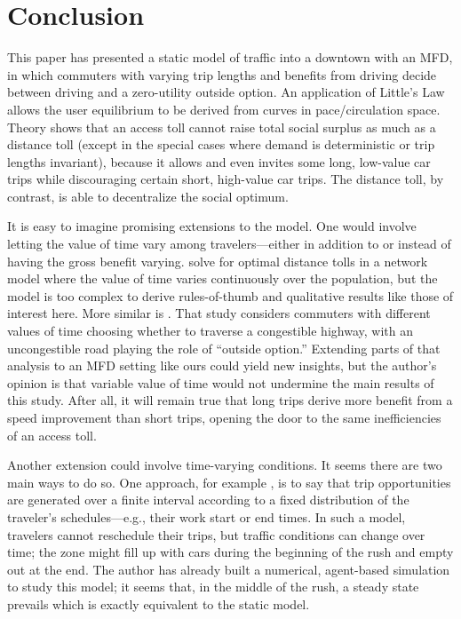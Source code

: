 \documentclass[preprint,authoryear]{elsarticle}
\begin{document}
\section{Conclusion}
\label{sec:conclusion}

This paper has presented a static model of traffic into a downtown with an MFD, in which commuters with varying trip lengths and benefits from driving decide between driving and a zero-utility outside option. An application of Little's Law allows the user equilibrium to be derived from curves in pace/circulation space. Theory shows that an access toll cannot raise total social surplus as much as a distance toll (except in the special cases where demand is deterministic or trip lengths invariant), because it allows and even invites some long, low-value car trips while discouraging certain short, high-value car trips. The distance toll, by contrast, is able to decentralize the social optimum.


It is easy to imagine promising extensions to the model. One would involve letting the value of time vary among travelers---either in addition to or instead of having the gross benefit varying.  \citet{Meng2012} solve for optimal distance tolls in a network model where the value of time varies continuously over the population, but the model is too complex to derive rules-of-thumb and qualitative results like those of interest here. More similar is \citet{Mayet2000}. That study considers commuters with different values of time choosing whether to traverse a congestible highway, with an uncongestible road playing the role of ``outside option.'' Extending parts of that analysis to an MFD setting like ours could yield new insights, but the author's opinion is that variable value of time would not undermine the main results of this study. After all, it will remain true that long trips derive more benefit from a speed improvement than short trips, opening the door to the same inefficiencies of an access toll.

Another extension could involve time-varying conditions. It seems there are two main ways to do so. One approach, for example \citet{Gonzales2015}, is to say that trip opportunities are generated over a finite interval according to a fixed distribution of the traveler's schedules---e.g., their work start or end times. In such a model, travelers cannot reschedule their trips, but traffic conditions can change over time; the zone might fill up with cars during the beginning of the rush and empty out at the end. The author has already built a numerical, agent-based simulation to study this model; it seems that, in the middle of the rush, a steady state prevails which is exactly equivalent to the static model. 
\end{document}
